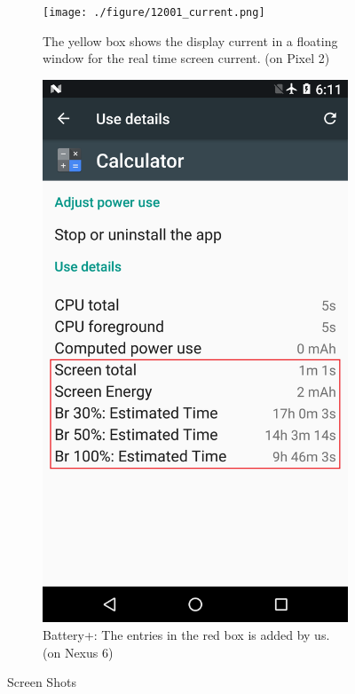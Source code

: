 \begin{figure}[h]
	\begin{subfigure}[]{0.4\columnwidth}
		\texttt{[image: ./figure/12001\_current.png]}
		\caption{The yellow box shows the display current in a floating window
			for the real time screen current. (on Pixel 2)}
	\end{subfigure}
	\hfill
	\begin{subfigure}[]{0.4\columnwidth}
		\includegraphics[width=\textwidth]{./figure/513_abat_plus_screenshot.png}
		\caption{Battery+: The entries in the red box is
			added by us. (on Nexus 6)}
	\end{subfigure}
        \vspace{-0.1in}
	\caption{Screen Shots}
	\label{fig:tool2_screenshot}
\end{figure}
\fi


